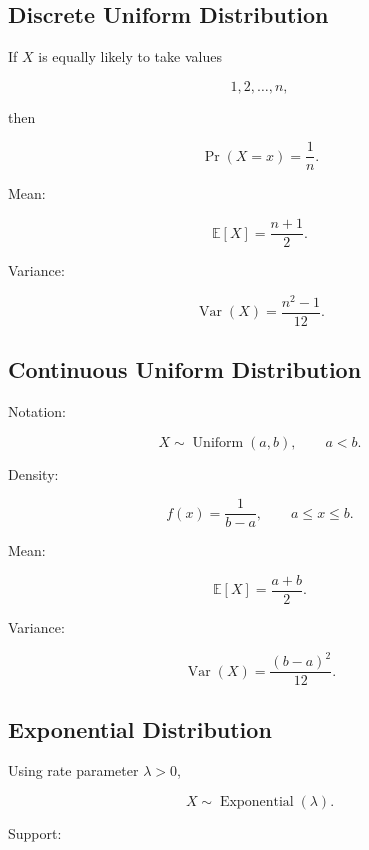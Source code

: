 \subsection{Discrete Uniform Distribution}
\label{subsec:discrete-uniform-reference}

If \(X\) is equally likely to take values

\[
1,2,\ldots,n,
\]

then

\[
\boxed{
\Pr(X=x)
=
\frac1n.
}
\]

Mean:

\[
\boxed{
\mathbb{E}[X]
=
\frac{n+1}{2}.
}
\]

Variance:

\[
\boxed{
\operatorname{Var}(X)
=
\frac{
n^2-1
}{
12
}.
}
\]

\subsection{Continuous Uniform Distribution}
\label{subsec:continuous-uniform-reference}

Notation:

\[
\boxed{
X\sim\operatorname{Uniform}(a,b),
\qquad
a<b.
}
\]

Density:

\[
\boxed{
f(x)
=
\frac{
1
}{
b-a
},
\qquad
a\leq x\leq b.
}
\]

Mean:

\[
\boxed{
\mathbb{E}[X]
=
\frac{a+b}{2}.
}
\]

Variance:

\[
\boxed{
\operatorname{Var}(X)
=
\frac{
(b-a)^2
}{
12
}.
}
\]

\subsection{Exponential Distribution}
\label{subsec:exponential-distribution-reference}

Using rate parameter \(\lambda>0\),

\[
\boxed{
X\sim\operatorname{Exponential}(\lambda).
}
\]

Support:

